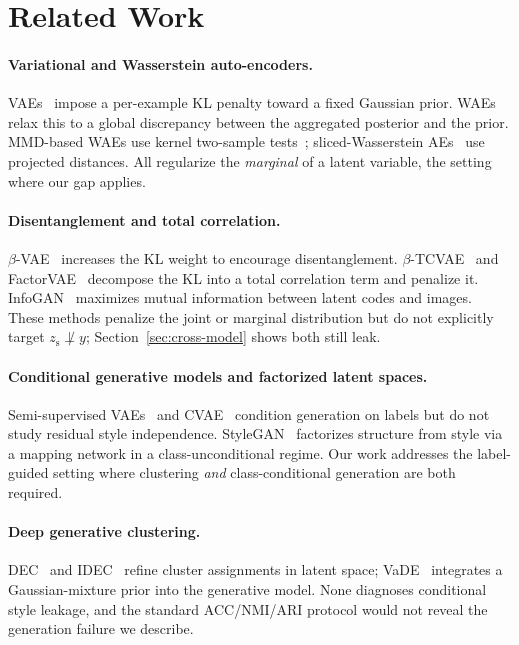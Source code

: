 \documentclass[10pt,letterpaper]{article}
\newcommand{\zs}{z_{\mathrm{s}}}
\begin{document}
\section{Related Work}

\paragraph{Variational and Wasserstein auto-encoders.}
VAEs~\citep{kingma2013autoencoding} impose a per-example KL penalty toward a
fixed Gaussian prior. WAEs~\citep{tolstikhin2017wasserstein} relax this to a
global discrepancy between the aggregated posterior and the prior. MMD-based
WAEs use kernel two-sample tests~\citep{gretton2012kernel}; sliced-Wasserstein
AEs~\citep{kolouri2018sliced} use projected distances. All regularize the
\emph{marginal} of a latent variable, the setting where our gap applies.

\paragraph{Disentanglement and total correlation.}
$\beta$-VAE~\citep{higgins2017beta} increases the KL weight to encourage
disentanglement. $\beta$-TCVAE~\citep{chen2018isolating} and
FactorVAE~\citep{kim2018disentangling} decompose the KL into a total
correlation term and penalize it. InfoGAN~\citep{chen2016infogan} maximizes
mutual information between latent codes and images. These methods penalize
the joint or marginal distribution but do not explicitly target
$\zs\not\perp y$; Section~\ref{sec:cross-model} shows both still leak.

\paragraph{Conditional generative models and factorized latent spaces.}
Semi-supervised VAEs~\citep{kingma2014semi} and
CVAE~\citep{sohn2015learning} condition generation on labels but do not
study residual style independence. StyleGAN~\citep{karras2019style}
factorizes structure from style via a mapping network in a
class-unconditional regime. Our work addresses the label-guided setting
where clustering \emph{and} class-conditional generation are both required.

\paragraph{Deep generative clustering.}
DEC~\citep{xie2015unsupervised} and IDEC~\citep{guo2017improved} refine
cluster assignments in latent space; VaDE~\citep{jiang2016variational}
integrates a Gaussian-mixture prior into the generative model. None
diagnoses conditional style leakage, and the standard ACC/NMI/ARI protocol
would not reveal the generation failure we describe.
\end{document}
